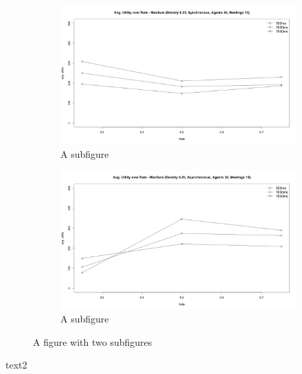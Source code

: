 \begin{figure}[H]
\centering
\begin{subfigure}{0.5\textwidth}
  \centering
  \includegraphics[width=1\linewidth]{graphics/experiments/dynamic/d_2.png}
  \caption{A subfigure}
  \label{fig:sub1}
\end{subfigure}%
\begin{subfigure}{0.5\textwidth}
  \centering
  \includegraphics[width=1\linewidth]{graphics/experiments/dynamic/d_3.png}
  \caption{A subfigure}
  \label{fig:sub2}
\end{subfigure}
\caption{A figure with two subfigures}
\label{fig:test}
\end{figure}

text2

